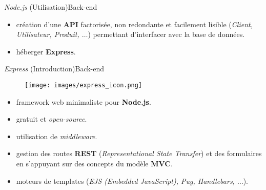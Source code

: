\documentclass[usenames,dvipsnames]{beamer}
\begin{document}
\begin{frame}{\textit{Node.js} (Utilisation)}{Back-end}
  \begin{itemize}
    \item création d'une \textbf{API} factorisée, non redondante et facilement lisible (\textit{Client, Utilisateur, Produit, $\dots$}) permettant d'interfacer avec la base de données.
    \item héberger \textbf{Express}.
  \end{itemize}
\end{frame}
\begin{frame}{\textit{Express} (Introduction)}{Back-end}
  \begin{figure}[!ht]
    \centering
    \texttt{[image: images/express\_icon.png]}
  \end{figure}

  \begin{itemize}
    \item framework web minimaliste pour \textbf{Node.js}.
    \item gratuit et \textit{open-source}.
    \item utilisation de \textit{middleware}.
    \item gestion des routes \textbf{REST} (\textit{Representational State Transfer}) et des formulaires en s'appuyant sur des concepts du modèle \textbf{MVC}.
    \item moteurs de templates (\textit{EJS (Embedded JavaScript), Pug, Handlebars, $\dots$}).
  \end{itemize}
\end{frame}
\end{document}
